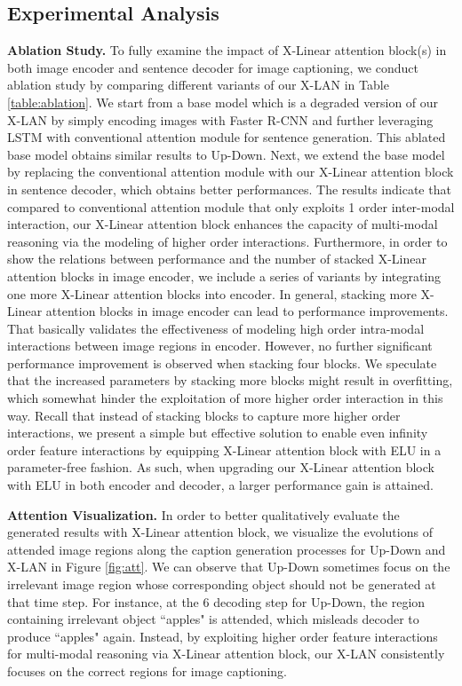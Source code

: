 \documentclass[10pt,twocolumn,letterpaper]{article}
\begin{document}
\subsection{Experimental Analysis}
\noindent\textbf{Ablation Study.}
To fully examine the impact of X-Linear attention block(s) in both image encoder and sentence decoder for image captioning, we conduct ablation study by comparing different variants of our X-LAN in Table \ref{table:ablation}. We start from a base model which is a degraded version of our X-LAN by simply encoding images with Faster R-CNN and further leveraging LSTM with conventional attention module for sentence generation. This ablated base model obtains similar results to Up-Down. Next, we extend the base model by replacing the conventional attention module with our X-Linear attention block in sentence decoder, which obtains better performances. The results indicate that compared to conventional attention module that only exploits 1 order inter-modal interaction, our X-Linear attention block enhances the capacity of multi-modal reasoning via the modeling of higher order interactions. Furthermore, in order to show the relations between performance and the number of stacked X-Linear attention blocks in image encoder, we include a series of variants by integrating one more X-Linear attention blocks into encoder. In general, stacking more X-Linear attention blocks in image encoder can lead to performance improvements. That basically validates the effectiveness of modeling high order intra-modal interactions between image regions in encoder. However, no further significant performance improvement is observed when stacking four blocks. We speculate that the increased parameters by stacking more blocks might result in overfitting, which somewhat hinder the exploitation of more higher order interaction in this way. Recall that instead of stacking blocks to capture more higher order interactions, we present a simple but effective solution to enable even infinity order feature interactions by equipping X-Linear attention block with ELU in a parameter-free fashion. As such, when upgrading our X-Linear attention block with ELU in both encoder and decoder, a larger performance gain is attained.




\noindent\textbf{Attention Visualization.}
In order to better qualitatively evaluate the generated results with X-Linear attention block, we visualize the evolutions of attended image regions along the caption generation processes for Up-Down and X-LAN in Figure \ref{fig:att}. We can observe that Up-Down sometimes focus on the irrelevant image region whose corresponding object should not be generated at that time step. For instance, at the 6 decoding step for Up-Down, the region containing irrelevant object ``apples" is attended, which misleads decoder to produce ``apples" again. Instead, by exploiting higher order feature interactions for multi-modal reasoning via X-Linear attention block, our X-LAN consistently focuses on the correct regions for image captioning.
\end{document}
